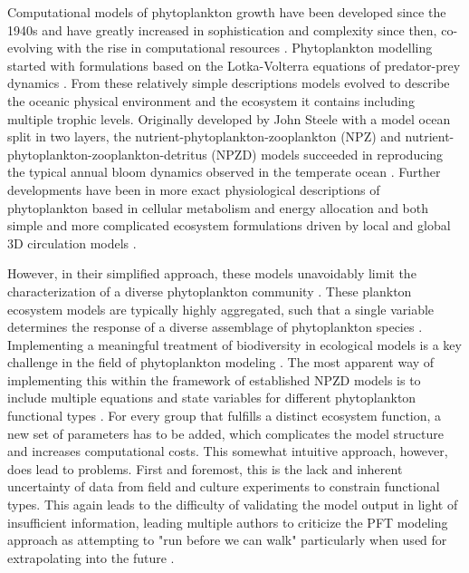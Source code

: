 Computational models of phytoplankton growth have been developed since the 1940s and have greatly increased in sophistication and complexity since then, co-evolving with the rise in computational resources \citep{Gentleman2002a}. Phytoplankton modelling started with formulations based on the Lotka-Volterra equations of predator-prey dynamics \citep{Fleming1939}. From these relatively simple descriptions models evolved to describe the oceanic physical environment and the ecosystem it contains including multiple trophic levels. Originally developed by John Steele with a model ocean split in two layers, the nutrient-phytoplankton-zooplankton (NPZ) and nutrient-phytoplankton-zooplankton-detritus (NPZD) models succeeded in reproducing the typical annual bloom dynamics observed in the temperate ocean \citep{Steele1958,Evans1988,Fasham1990a}. Further developments have been in more exact physiological descriptions of phytoplankton based in cellular metabolism and energy allocation \citep{Geider1997} and both simple and more complicated ecosystem formulations driven by local and global 3D circulation models \citep{Lacroix2007, Hirata2013}.

However, in their simplified approach, these models unavoidably limit the characterization of a diverse phytoplankton community \citep{Bruggeman2009}. These plankton ecosystem models are typically highly aggregated, such that a single variable determines the response of a diverse assemblage of phytoplankton species \citep{Franks2009}. Implementing a meaningful treatment of biodiversity in ecological models is a key challenge in the field of phytoplankton modeling \citep{Queiros2015}. The most apparent way of implementing this within the framework of established NPZD models is to include multiple equations and state variables for different phytoplankton functional types \citep{LeQuere2005}. For every group that fulfills a distinct ecosystem function, a new set of parameters has to be added, which complicates the model structure and increases computational costs. This somewhat intuitive approach, however, does lead to problems. First and foremost, this is the lack and inherent uncertainty of data from field and culture experiments to constrain functional types. This again leads to the difficulty of validating the model output in light of insufficient information, leading multiple authors to criticize the PFT modeling approach as attempting to "run before we can walk" particularly when used for extrapolating into the future \citep{Anderson2005,Shimoda2016}. 

